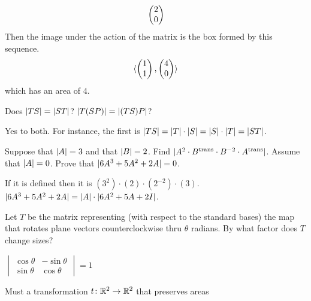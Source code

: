 \begin{exercises}
\begin{answer}
\begin{equation*}
{          \begin{pmatrix} 2 \\ 0 \end{pmatrix}
       }
      \end{equation*}
      Then the image under the action of the matrix is the box formed
      by this sequence.
      \begin{equation*}
        \langle
          \begin{pmatrix} 1 \\ 1 \end{pmatrix},
          \begin{pmatrix} 4 \\ 0 \end{pmatrix}
         \rangle
      \end{equation*}
      which has an area of $4$.
     \end{answer}
  \recommended \item 
    Does \( \deter{TS}=\deter{ST} \)?
    \( \deter{T(SP)}=\deter{(TS)P} \)?
    \begin{answer}
      Yes to both.
      For instance, the first is \( \deter{TS}=\deter{T}\cdot\deter{S}=
                     \deter{S}\cdot\deter{T}=\deter{ST} \).  
    \end{answer}
  \item 
   \begin{exparts}
     \partsitem Suppose that \( \deter{A}=3 \) and that \( \deter{B}=2 \).
        Find \( \deter{A^2\cdot \trans{B}\cdot B^{-2}\cdot \trans{A} } \).
     \partsitem Assume that \( \deter{A}=0 \).
        Prove that \( \deter{6A^3+5A^2+2A}=0 \).
    \end{exparts}
    \begin{answer}
      \begin{exparts}
        \partsitem If it is defined then it is 
           \( (3^2)\cdot (2)\cdot (2^{-2})\cdot (3) \).
        \partsitem \( \deter{6A^3+5A^2+2A}=\deter{A}\cdot\deter{6A^2+5A+2I} \).
      \end{exparts}  
    \end{answer}
  \recommended \item
    Let \( T \) be the matrix representing (with respect to the standard
    bases) the map that rotates plane vectors counterclockwise thru
    \( \theta \) radians.
    By what factor does \( T \) change sizes?
    \begin{answer}
       \(\begin{vmatrix}
                \cos\theta  &-\sin\theta  \\
                \sin\theta  &\cos\theta
              \end{vmatrix}=1 \)  
    \end{answer}
  \recommended \item
    Must a transformation \( \mbox{$t\colon \mathbb{R}^2\to \mathbb{R}^2$} \) that preserves areas

\end{exercises}
